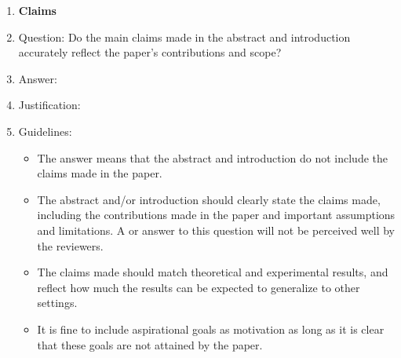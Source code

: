 \documentclass{article}
\begin{document}
\begin{enumerate}

\item {\bf Claims}
    \item[] Question: Do the main claims made in the abstract and introduction accurately reflect the paper's contributions and scope?
    \item[] Answer: \answerTODO{} %
    \item[] Justification: \justificationTODO{}
    \item[] Guidelines:
    \begin{itemize}
        \item The answer \answerNA{} means that the abstract and introduction do not include the claims made in the paper.
        \item The abstract and/or introduction should clearly state the claims made, including the contributions made in the paper and important assumptions and limitations. A \answerNo{} or \answerNA{} answer to this question will not be perceived well by the reviewers. 
        \item The claims made should match theoretical and experimental results, and reflect how much the results can be expected to generalize to other settings. 
        \item It is fine to include aspirational goals as motivation as long as it is clear that these goals are not attained by the paper. 
    \end{itemize}


\end{enumerate}
\end{document}

